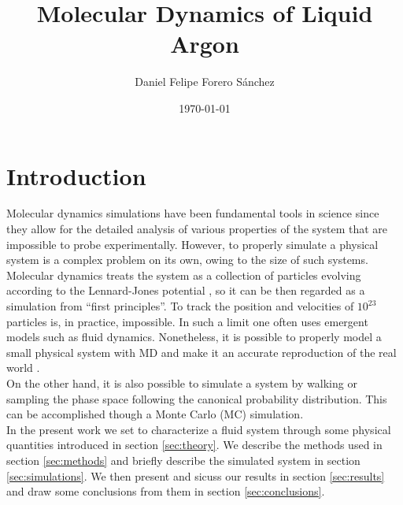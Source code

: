 \documentclass[%
aps,
pra,%
amsmath,amssymb,
preprint,%
reprint,%
notitlepage,
a4paper]{revtex4-1}
\begin{document}
	
	
	\title[Computer Simulation of Physical Systems]{Molecular Dynamics of Liquid Argon}%
	
	\author{Daniel Felipe Forero Sánchez}
	
	
	\date{\today}%

	
	\begin{abstract}
		

	\end{abstract}


	\maketitle

	
	\section{Introduction}
	Molecular dynamics simulations have been fundamental tools in science since they allow for the detailed analysis of various properties of the system that are impossible to probe experimentally. However, to properly simulate a physical system is a complex problem on its own, owing to the size of such systems. Molecular dynamics treats the system as a collection of particles evolving according to the Lennard-Jones potential \cite{Jones1924}, so it can be then regarded as a simulation from ``first principles''. To track the position and velocities of $10^{23}$ particles is, in practice, impossible. In such a limit one often uses emergent models such as fluid dynamics. Nonetheless, it is possible to properly model a small physical system with MD and make it an accurate reproduction of the real world \cite{Rahman1964}.\\
	On the other hand, it is also possible to simulate a system by walking or sampling the phase space following the canonical probability distribution. This can be accomplished though a Monte Carlo (MC) simulation.\\
	In the present work we set to characterize a fluid system through some physical quantities introduced in section \ref{sec:theory}. We describe the methods used in section \ref{sec:methods} and briefly describe the simulated system in section \ref{sec:simulations}. We then present and sicuss our results in section \ref{sec:results} and draw some conclusions from them in section \ref{sec:conclusions}.
\end{document}

